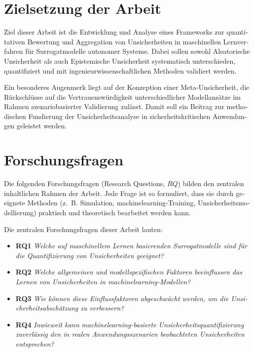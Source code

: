 \begin{otherlanguage}{ngerman}
\section{Zielsetzung der Arbeit}

Ziel dieser Arbeit ist die Entwicklung und Analyse eines Frameworks zur quantitativen Bewertung und Aggregation von Unsicherheiten in maschinellen Lernverfahren für Surrogatmodelle autonomer Systeme. Dabei sollen sowohl \gls{Aleatorische Unsicherheit} als auch \gls{Epistemische Unsicherheit} systematisch unterschieden, quantifiziert und mit ingenieurwissenschaftlichen Methoden validiert werden.

Ein besonderes Augenmerk liegt auf der Konzeption einer Meta-Unsicherheit, die Rückschlüsse auf die Vertrauenswürdigkeit unterschiedlicher Modellansätze im Rahmen szenariobasierter Validierung zulässt. Damit soll ein Beitrag zur methodischen Fundierung der Unsicherheitsanalyse in sicherheitskritischen Anwendungen geleistet werden.

\section{Forschungsfragen}

Die folgenden Forschungsfragen (Research Questions, $RQ$) bilden den zentralen inhaltlichen Rahmen der Arbeit. Jede Frage ist so formuliert, dass sie durch geeignete Methoden (z.~B. Simulation, \gls{machinelearning}-Training, Unsicherheitsmodellierung) praktisch und theoretisch bearbeitet werden kann. 

Die zentralen Forschungsfragen dieser Arbeit lauten:

\begin{itemize}
  \item \textbf{RQ1} \textit{Welche auf maschinellem Lernen basierenden Surrogatmodelle sind für die Quantifizierung von Unsicherheiten geeignet?}
  \item \textbf{RQ2} \textit{Welche allgemeinen und modellspezifischen Faktoren beeinflussen das Lernen von Unsicherheiten in \gls{machinelearning}-Modellen?}
  \item \textbf{RQ3} \textit{Wie können diese Einflussfaktoren abgeschwächt werden, um die Unsicherheitsabschätzung zu verbessern?}
  \item \textbf{RQ4} \textit{Inwieweit kann \gls{machinelearning}-basierte Unsicherheitsquantifizierung zuverlässig den in realen Anwendungsszenarien beobachteten Unsicherheiten entsprechen?}
\end{itemize}


\end{otherlanguage}
